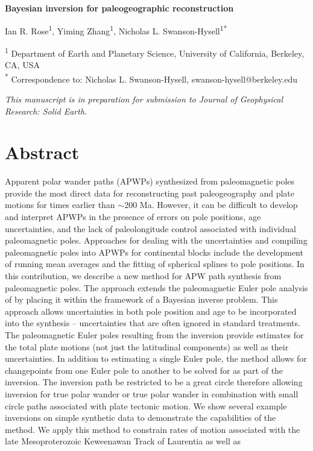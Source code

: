 \documentclass[11pt,letterpaper]{article}
\begin{document}
\begin{flushleft}
{\Large \textbf{Bayesian inversion for paleogeographic reconstruction}}

Ian R. Rose\textsuperscript{1},
Yiming Zhang\textsuperscript{1},
Nicholas L. Swanson-Hysell\textsuperscript{1}\textsuperscript{*}

\bigskip
\textsuperscript{1} Department of Earth and Planetary Science, University of California, Berkeley, CA, USA\\
\textsuperscript{*} Correspondence to: Nicholas L. Swanson-Hysell, swanson-hysell@berkeley.edu
\bigskip

\end{flushleft}

\noindent\textit{This manuscript is in preparation for submission to Journal of Geophysical Research: Solid Earth.}

\linenumbers

\section*{Abstract \label{sec:ABSTRACT}}

Apparent polar wander paths (APWPs) synthesized from paleomagnetic poles provide the most direct data for reconstructing past paleogeography and plate motions for times earlier than $\sim$200 Ma. However, it can be difficult to develop and interpret APWPs in the presence of errors on pole positions, age uncertainties, and the lack of paleolongitude control associated with individual paleomagnetic poles. Approaches for dealing with the uncertainties and compiling paleomagnetic poles into APWPs for continental blocks include the development of running mean averages and the fitting of spherical splines to pole positions. In this contribution, we describe a new method for APW path synthesis from paleomagnetic poles. The approach extends the paleomagnetic Euler pole analysis of \citet{Gordon1984a} by placing it within the framework of a Bayesian inverse problem. This approach allows uncertainties in both pole position and age to be incorporated into the synthesis -- uncertainties that are often ignored in standard treatments. The paleomagnetic Euler poles resulting from the inversion provide estimates for the total plate motions (not just the latitudinal components) as well as their uncertainties. In addition to estimating a single Euler pole, the method allows for changepoints from one Euler pole to another to be solved for as part of the inversion. The inversion path be restricted to be a great circle therefore allowing inversion for true polar wander or true polar wander in combination with small circle paths associated with plate tectonic motion. We show several example inversions on simple synthetic data to demonstrate the capabilities of the method. We apply this method to constrain rates of motion associated with the late Mesoproterozoic Keweenawan Track of Laurentia as well as 
\end{document}
